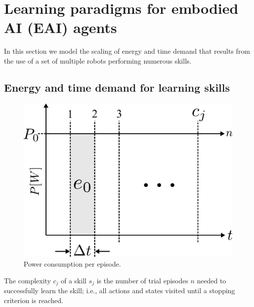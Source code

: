 \section{Learning paradigms for embodied AI (EAI) agents}\label{sec:learning_paradigms}
In this section we model the scaling of energy and time demand that results from the use of a set of multiple robots performing numerous skills.

\subsection{Energy and time demand for learning skills}
\begin{figure}[!ht]
	\centering
	\includegraphics[width=0.95\columnwidth]{fig/power_per_episode.pdf}
	\caption{Power consumption per episode.}
	\label{fig:power_per_episode}
\end{figure}
\begin{tcolorbox}
	\begin{definition}\label{definition:complexity}
		The complexity $c_j$ of a skill $ s_j $  is the number of trial episodes $n$ needed to successfully learn the skill; i.e., all actions and states visited until a stopping criterion is reached. 
	\end{definition}
\end{tcolorbox}

